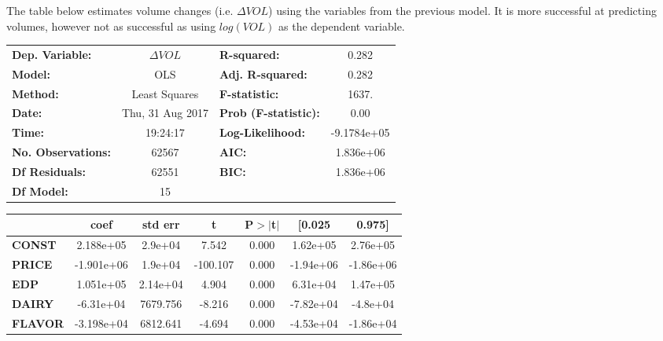\documentclass{article}
\begin{document}
The table below estimates volume changes (i.e. $\Delta VOL$) using the variables from the previous model. It is more successful at predicting volumes, however not as successful as using $log(VOL)$ as the dependent variable.

\begin{center}
\begin{tabular}{lclc}
\toprule
\textbf{Dep. Variable:}    &        $\Delta VOL$        & \textbf{  R-squared:         } &      0.282    \\
\textbf{Model:}            &       OLS        & \textbf{  Adj. R-squared:    } &      0.282    \\
\textbf{Method:}           &  Least Squares   & \textbf{  F-statistic:       } &      1637.    \\
\textbf{Date:}             & Thu, 31 Aug 2017 & \textbf{  Prob (F-statistic):} &      0.00     \\
\textbf{Time:}             &     19:24:17     & \textbf{  Log-Likelihood:    } & -9.1784e+05   \\
\textbf{No. Observations:} &       62567      & \textbf{  AIC:               } &  1.836e+06    \\
\textbf{Df Residuals:}     &       62551      & \textbf{  BIC:               } &  1.836e+06    \\
\textbf{Df Model:}         &          15      & \textbf{                     } &               \\
\bottomrule
\end{tabular}
\begin{tabular}{lcccccc}
               & \textbf{coef} & \textbf{std err} & \textbf{t} & \textbf{P$>$$|$t$|$} & \textbf{[0.025} & \textbf{0.975]}  \\
\midrule
\textbf{CONST} &    2.188e+05  &      2.9e+04     &     7.542  &         0.000        &     1.62e+05    &     2.76e+05     \\
\textbf{PRICE}    &   -1.901e+06  &      1.9e+04     &  -100.107  &         0.000        &    -1.94e+06    &    -1.86e+06     \\
\textbf{EDP}    &    1.051e+05  &     2.14e+04     &     4.904  &         0.000        &     6.31e+04    &     1.47e+05     \\
\textbf{DAIRY}    &    -6.31e+04  &     7679.756     &    -8.216  &         0.000        &    -7.82e+04    &     -4.8e+04     \\
\textbf{FLAVOR}    &   -3.198e+04  &     6812.641     &    -4.694  &         0.000        &    -4.53e+04    &    -1.86e+04     \\

\end{tabular}
\end{center}
\end{document}
